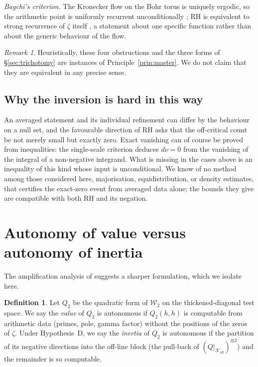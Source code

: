 \documentclass[11pt]{amsart}
\theoremstyle{definition}
\newtheorem{definition}[theorem]{Definition}
\theoremstyle{remark}
\newtheorem{remark}[theorem]{Remark}
\newcommand{\Koff}{\mathcal{K}_{\mathrm{off}}}
\newcommand{\Wtwo}{\mathcal{W}_2}
\newcommand{\dnu}{d\nu}
\begin{document}
\emph{Bagchi's criterion.} The Kronecker flow on the Bohr torus is uniquely
ergodic, so the arithmetic point is uniformly recurrent unconditionally
\cite[\S5.5]{P27}; RH is equivalent to strong recurrence of $\zeta$ itself
\cite{Bagchi}, a statement about one specific function rather than about the
generic behaviour of the flow.

\begin{remark}\label{obs:collapse}
Heuristically, these four obstructions and the three forms of
\S\ref{sec:trichotomy} are instances of Principle~\ref{prin:master}. We do
not claim that they are equivalent in any precise sense.
\end{remark}

\subsection{Why the inversion is hard in this way}
An averaged statement and its individual refinement can differ by the
behaviour on a null set, and the favourable direction of RH asks that the
off-critical count be not merely small but exactly zero. Exact vanishing can
of course be proved from inequalities: the single-scale criterion
\cite[Thm~4.4]{P27} deduces $\dnu=0$ from the vanishing of the integral of a
non-negative integrand. What is missing in the cases above is an inequality
of this kind whose input is unconditional. We know of no method among those
considered here, majorisation, equidistribution, or density estimates, that
certifies the exact-zero event from averaged data alone; the bounds they
give are compatible with both RH and its negation.

\section{Autonomy of value versus autonomy of inertia}\label{sec:autonomy}

The amplification analysis of \cite{P28} suggests a sharper formulation, which
we isolate here.

\begin{definition}
Let $Q_2$ be the quadratic form of $\Wtwo$ on the thickened-diagonal test
space. We say the \emph{value} of $Q_2$ is autonomous if $Q_2(h,h)$ is
computable from arithmetic data (primes, pole, gamma factor) without the
positions of the zeros of $\zeta$. Under Hypothesis~D, we say the
\emph{inertia} of $Q_2$ is autonomous if the partition of its negative
directions into the off-line block (the pull-back of
$(Q|_{\Koff})^{\otimes2}$) and the remainder is so computable.
\end{definition}
\end{document}
